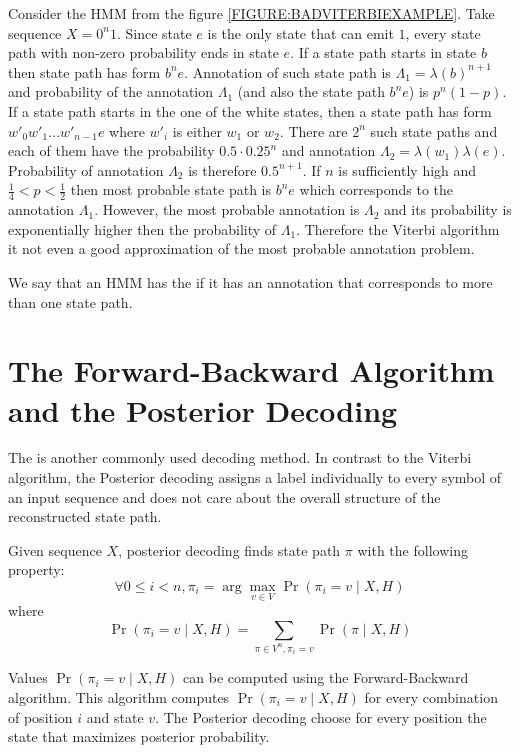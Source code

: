 \begin{example}
Consider the HMM from the figure \ref{FIGURE:BADVITERBIEXAMPLE}. Take sequence $X=0^n1$.
Since state $e$ is the only state that can emit $1$, every state path with non-zero
probability ends in state $e$. If a state path starts in state $b$ then state
path has form $b^ne$. Annotation of such state path is $\Lambda_1=\lambda(b)^{n+1}$
and probability of the annotation $\Lambda_1$ (and also the state path $b^ne$) is $p^n(1-p)$.
If a state path starts in the one of the white states, then a state path
has form $w'_0w'_1\dots w'_{n-1}e$ where $w'_i$ is either $w_1$ or $w_2$.
There are $2^n$ such state paths and each of them have the probability $0.5\cdot
0.25^n$ and annotation $\Lambda_2=\lambda(w_1)\lambda(e)$. Probability of
annotation $\Lambda_2$ is therefore $0.5^{n+1}$.
If $n$ is sufficiently high and $\frac14<p<\frac12$ then most probable state
path is $b^ne$ which corresponds to the annotation $\Lambda_1$. However, the most
probable annotation is $\Lambda_2$ and its probability is exponentially higher
then the probability of $\Lambda_1$. Therefore the Viterbi algorithm it not even a
good approximation of the most probable annotation problem.

We say that an HMM has the  if it has an annotation that
corresponds to more than one state path.
\end{example}


\section{The Forward-Backward Algorithm and  the Posterior Decoding}

The  is another commonly used decoding method. In
contrast to the Viterbi algorithm, the Posterior decoding assigns a label individually to
every symbol of an input sequence and does not care about the overall structure of
the reconstructed state path. 

Given sequence $X$, posterior decoding finds state path $\pi$ with the following
property:
\[\forall 0\leq i< n, \pi_i=\arg\max_{v\in V}\Pr\left(\pi_i=v\mid X,H\right) \]
where \[\Pr\left(\pi_i=v\mid X,H\right) = \sum_{\pi\in V^n,\pi_i=v}\Pr\left(\pi\mid X,H\right)\]

Values $\Pr\left(\pi_i=v\mid X,H\right)$ can be computed using the Forward-Backward
algorithm. This algorithm computes $\Pr\left(\pi_i=v\mid X,H\right)$ for every
combination of position $i$ and state $v$. The Posterior decoding choose for
every position the state that maximizes posterior probability.

